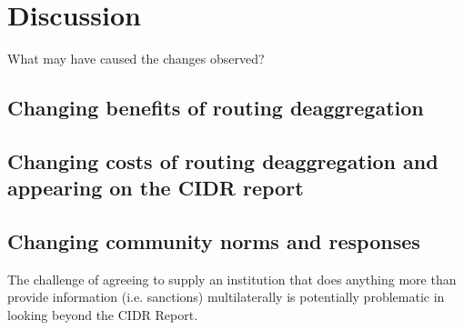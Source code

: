 \chapter{Discussion}
\label{chap:discussion}


What may have caused the changes observed?

\section{Changing benefits of routing deaggregation}
\section{Changing costs of routing deaggregation and appearing on the CIDR report}
\section{Changing community norms and responses}


The challenge of agreeing to supply an institution that does anything more than provide information (i.e. sanctions) multilaterally is potentially problematic in looking beyond the CIDR Report.


